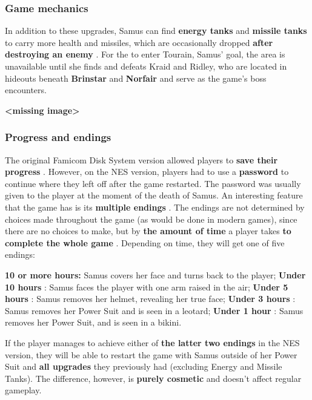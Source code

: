 \documentclass[a4paper,10pt]{book}
\begin{document}
 \subsubsection{Game mechanics }
 
 
              In addition to these upgrades, Samus can find  \textbf{energy tanks }  and
               \textbf{missile tanks }  to carry more health and missiles, which are
              occasionally dropped  \textbf{after destroying an enemy } . For the to
              enter Tourain, Samus' goal, the area is unavailable until she finds
              and defeats Kraid and Ridley, who are located in hideouts beneath
               \textbf{Brinstar }  and  \textbf{Norfair }  and serve as the game's boss encounters.
               
 
 
 \textbf{<missing image>}
 
 \subsubsection{Progress and endings }
 The original
          Famicom Disk System version allowed players to  \textbf{save their progress } .
          However, on the NES version, players had to use a  \textbf{password }  to continue
          where they left off after the game restarted. The password was usually
          given to the player at the moment of the death of Samus. An
          interesting feature that the game has is its  \textbf{multiple endings } . The
          endings are not determined by choices made throughout the game (as
          would be done in modern games), since there are no choices to make,
          but by  \textbf{the amount of time }  a player takes  \textbf{to complete the whole game } .
          Depending on time, they will get one of five endings:

           
 \textbf{10 or more hours: }  Samus covers her face and turns back to the player; 
 \textbf{Under 10 hours } : Samus faces the player with one arm raised in the air; 
 \textbf{Under 5 hours } : Samus removes her helmet, revealing her true face; 
 \textbf{Under 3 hours } : Samus removes her Power Suit and is seen in a leotard; 
 \textbf{Under 1 hour } : Samus removes her Power Suit, and is seen in a
                  bikini. 
 
 If the
          player manages to achieve either of  \textbf{the latter two endings }  in the NES
          version, they will be able to restart the game with Samus outside of
          her Power Suit and  \textbf{all upgrades }  they previously had (excluding Energy
          and Missile Tanks). The difference, however, is  \textbf{purely cosmetic }  and
          doesn't affect regular gameplay. 
 
\end{document}
